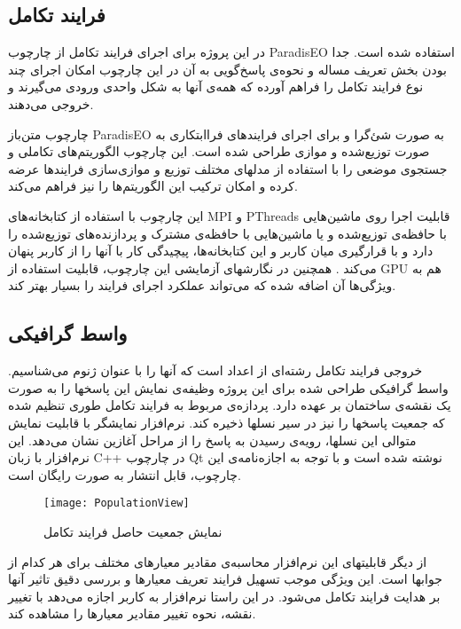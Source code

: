 \documentclass{report}
\begin{document}
\subsection{فرایند تکامل}
در این پروژه برای اجرای فرایند تکامل از چارچوب ParadisEO استفاده شده است. جدا بودن بخش تعریف مساله و نحوه‌ی پاسخ‌گویی به آن در این چارچوب امکان اجرای چند نوع فرایند تکامل را فراهم آورده که همه‌ی آنها به شکل واحدی ورودی می‌گیرند و خروجی می‌دهند.

چارچوب متن‌باز ParadisEO به صورت شئ‌گرا و برای اجرای فرایندهای فراابتکاری به صورت توزیع‌شده و موازی طراحی شده است. این چارچوب الگوریتم‌های تکاملی و جستجوی موضعی را با استفاده از مدلهای مختلف توزیع و موازی‌سازی فرایندها عرضه کرده و امکان ترکیب این الگوریتم‌ها را نیز فراهم می‌کند.

این چارچوب با استفاده از کتابخانه‌های MPI و PThreads قابلیت اجرا روی ماشین‌هایی با حافظه‌ی توزیع‌شده و یا ماشین‌هایی با حافظه‌ی مشترک و پردازنده‌های توزیع‌شده را دارد و با قرارگیری میان کاربر و این کتابخانه‌ها، پیچیدگی کار با آنها را از کاربر پنهان می‌کند \cite{cahon_paradiseo}. همچنین در نگارشهای آزمایشی این چارچوب، قابلیت استفاده از GPU هم به ویژگی‌ها آن اضافه شده که می‌تواند عملکرد اجرای فرایند را بسیار بهتر کند.
 
\subsection{واسط گرافیکی}
خروجی فرایند تکامل رشته‌ای از اعداد است که آنها را با عنوان ژنوم می‌شناسیم. واسط گرافیکی طراحی شده برای این پروژه وظیفه‌ی نمایش این پاسخها را به صورت یک نقشه‌ی ساختمان بر عهده دارد. پردازه‌ی مربوط به فرایند تکامل طوری تنظیم شده که جمعیت پاسخها را نیز در سیر نسلها ذخیره کند. نرم‌افزار نمایشگر با قابلیت نمایش متوالی این نسلها، رویه‌ی رسیدن به پاسخ را از مراحل آغازین نشان می‌دهد. این نرم‌افزار با زبان C++ در چارچوب Qt نوشته شده است و با توجه به اجازه‌نامه‌ی این چارچوب، قابل انتشار به صورت رایگان است.

\begin{figure} \centerline{\texttt{[image: PopulationView]}} \caption{\label{fPopulationView}
نمایش جمعیت حاصل فرایند تکامل
 } \end{figure}
 
 از دیگر قابلیتهای این نرم‌افزار محاسبه‌ی مقادیر معیارهای مختلف برای هر کدام از جوابها است. این ویژگی موجب تسهیل فرایند تعریف معیارها و بررسی دقیق تاثیر آنها بر هدایت فرایند تکامل می‌شود. در این راستا نرم‌افزار به کاربر اجازه می‌دهد با تغییر نقشه، نحوه تغییر مقادیر معیارها را مشاهده کند.
 
\end{document}
